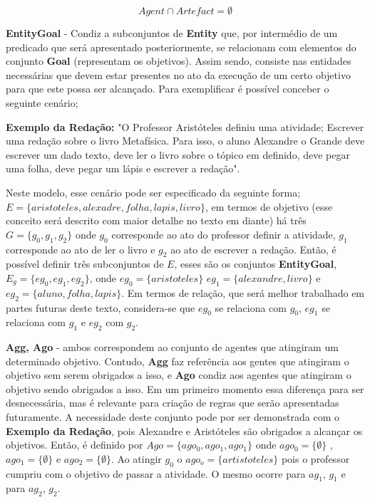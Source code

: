 \begin{equation} \label{agentsartefactvoid}
    Agent \cap Artefact = \emptyset
\end{equation}


\textbf{EntityGoal} - Condiz a subconjuntos de \textbf{Entity} que, por intermédio de um predicado que será apresentado posteriormente, se relacionam com elementos do conjunto \textbf{Goal} (representam os objetivos). Assim sendo, consiste nas entidades necessárias que devem estar presentes no ato da execução de um certo objetivo para que este possa ser alcançado. Para exemplificar é possível conceber o seguinte cenário; 

\textbf{Exemplo da Redação:} "O Professor Aristóteles definiu uma atividade; Escrever uma redação sobre o livro Metafísica. Para isso, o aluno Alexandre o Grande deve escrever um dado texto, deve ler o livro sobre o tópico em definido, deve pegar uma folha, deve pegar um lápis e escrever a redação".  


Neste modelo, esse cenário pode ser especificado da seguinte forma; $E = \{aristoteles, alexadre, folha, lapis, livro\}$, em termos de objetivo (esse conceito será descrito com maior detalhe no texto em diante) há três $G = \{ g_0, g_1,g_2\}$  onde $g_0$ corresponde ao ato do professor definir a atividade, $g_1$ corresponde ao ato de ler o livro e $g_2$ ao ato de escrever a redação. Então, é possível 
definir três subconjuntos de $E$, esses são os conjuntos \textbf{EntityGoal}, $E_g = \{ eg_{0}, eg_{1}, eg_{2} \}$, onde $eg_{0} = \{ aristoteles \}$ $eg_{1} = \{ alexandre, livro\}$ e $eg_{2} = \{ aluno, folha, lapis \}$. Em termos de relação, que será melhor trabalhado 
em partes futuras deste texto, considera-se que $eg_0$ se relaciona com $g_0$, $eg_1$ se relaciona com $g_1$ e $eg_2$ com $g_2$.

\textbf{Agg, Ago} - ambos correspondem ao conjunto de agentes que atingiram um determinado objetivo. Contudo, \textbf{Agg} faz referência aos gentes que atingiram o objetivo sem serem obrigados a isso, e \textbf{Ago} condiz aos agentes que atingiram o objetivo sendo obrigados a isso. Em um primeiro momento essa diferença para ser desnecessária, mas é relevante para criação de regras que serão apresentadas futuramente. A necessidade deste conjunto pode por ser demonstrada com o \textbf{Exemplo da Redação}, pois Alexandre e Aristóteles são obrigados a alcançar os objetivos. Então, é definido por $Ago = \{ ago_0, ago_1, ago_1 \}$ onde $ago_0 = \{ \emptyset \}$ , $ago_1 = \{ \emptyset \}$ e $ago_2 = \{ \emptyset \}$. Ao atingir $g_0$ o $ago_o = \{ artistoteles\}$ pois o professor cumpriu com o objetivo de passar a atividade. O mesmo ocorre para $ag_1$, $g_1$ e para $ag_2$, $g_2$.


